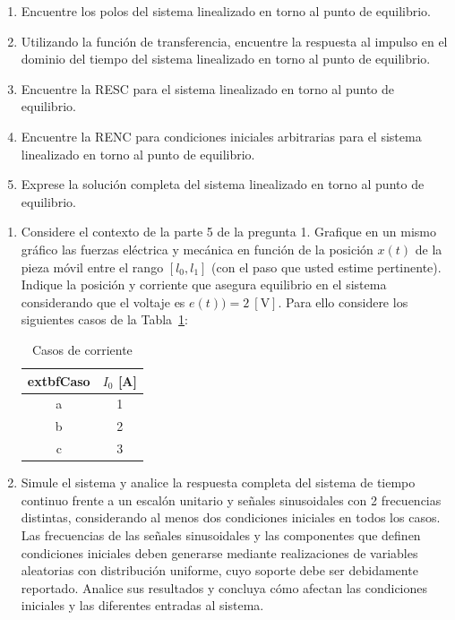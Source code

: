 \documentclass[
  11pt,
  letterpaper,
   addpoints,
   answers
  ]{exam}
\begin{document}
\begin{questions}
\begin{enumerate}
  \item Encuentre los polos del sistema linealizado en torno al punto de equilibrio.

  \item Utilizando la función de transferencia, encuentre la respuesta al impulso en el dominio del tiempo del sistema linealizado en torno al punto de equilibrio.

  \item Encuentre la RESC para el sistema linealizado en torno al punto de equilibrio.

  \item Encuentre la RENC para condiciones iniciales arbitrarias para el sistema linealizado en torno al punto de equilibrio.

  \item Exprese la solución completa del sistema linealizado en torno al punto de equilibrio.
\end{enumerate}

\vspace{0.5cm}
\noindent{}

\begin{enumerate}
  \item Considere el contexto de la parte 5 de la pregunta 1. Grafique en un mismo gráfico las fuerzas eléctrica y mecánica en función de la posición $x(t)$ de la pieza móvil entre el rango $[l_0, l_1]$ (con el paso que usted estime pertinente). Indique la posición y corriente que asegura equilibrio en el sistema considerando que el voltaje es $e(t)) = 2~[\text{V}]$. Para ello considere los siguientes casos de la Tabla~\ref{tab:casos-corriente}:

  \begingroup
  \renewcommand{\tablename}{Tabla}
  \begin{table}[H]
    \centering
    \caption{Casos de corriente}
    \label{tab:casos-corriente}
    \small
    \begin{tabular}{|c|c|}
      \hline
      	extbf{Caso} & $I_0$ [A] \\
      \hline
      a & 1 \\
      \hline
      b & 2 \\
      \hline
      c & 3 \\
      \hline
    \end{tabular}
  \end{table}
  \endgroup

  \item Simule el sistema y analice la respuesta completa del sistema de tiempo continuo frente a un escalón unitario y señales sinusoidales con 2 frecuencias distintas, considerando al menos dos condiciones iniciales en todos los casos. Las frecuencias de las señales sinusoidales y las componentes que definen condiciones iniciales deben generarse mediante realizaciones de variables aleatorias con distribución uniforme, cuyo soporte debe ser debidamente reportado. Analice sus resultados y concluya cómo afectan las condiciones iniciales y las diferentes entradas al sistema.


\end{enumerate}
\end{questions}
\end{document}
